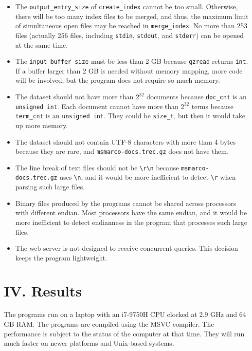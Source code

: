 \documentclass[12pt]{article}
\begin{document}
\begin{itemize}
\item
  The \texttt{output\_entry\_size} of \texttt{create\_index} cannot be
  too small. Otherwise, there will be too many index files to be merged,
  and thus, the maximum limit of simultaneous open files may be reached
  in \texttt{merge\_index}. No more than 253 files (actually 256 files,
  including \texttt{stdin}, \texttt{stdout}, and \texttt{stderr}) can be
  opened at the same time.
\item
  The \texttt{input\_buffer\_size} must be less than 2 GB because
  \texttt{gzread} returns \texttt{int}. If a buffer larger than 2 GB is
  needed without memory mapping, more code will be involved, but the
  program does not require so much memory.
\item
  The dataset should not have more than \(2^{32}\) documents because
  \texttt{doc\_cnt} is an \texttt{unsigned\ int}. Each document cannot
  have more than \(2^{32}\) terms because \texttt{term\_cnt} is an
  \texttt{unsigned\ int}. They could be \texttt{size\_t}, but then it
  would take up more memory.
\item
  The dataset should not contain UTF-8 characters with more than 4 bytes
  because they are rare, and \texttt{msmarco-docs.trec.gz} does not have
  them.
\item
  The line break of text files should not be
  \texttt{\textbackslash{}r\textbackslash{}n} because
  \texttt{msmarco-docs.trec.gz} uses \texttt{\textbackslash{}n}, and it
  would be more inefficient to detect \texttt{\textbackslash{}r} when
  parsing such large files.
\item
  Binary files produced by the programs cannot be shared across
  processors with different endian. Most processors have the same
  endian, and it would be more inefficient to detect endianness in the
  program that processes such large files.
\item
  The web server is not designed to receive concurrent queries.
  This decision keeps the program lightweight.
\end{itemize}

\hypertarget{iv-results}{%
\section{IV. Results}\label{iv-results}}

The programs run on a laptop with an i7-9750H CPU clocked at 2.9 GHz and
64 GB RAM. The programs are compiled using the MSVC compiler. The
performance is subject to the status of the computer at that time. They
will run much faster on newer platforms and Unix-based systems.
\end{document}
